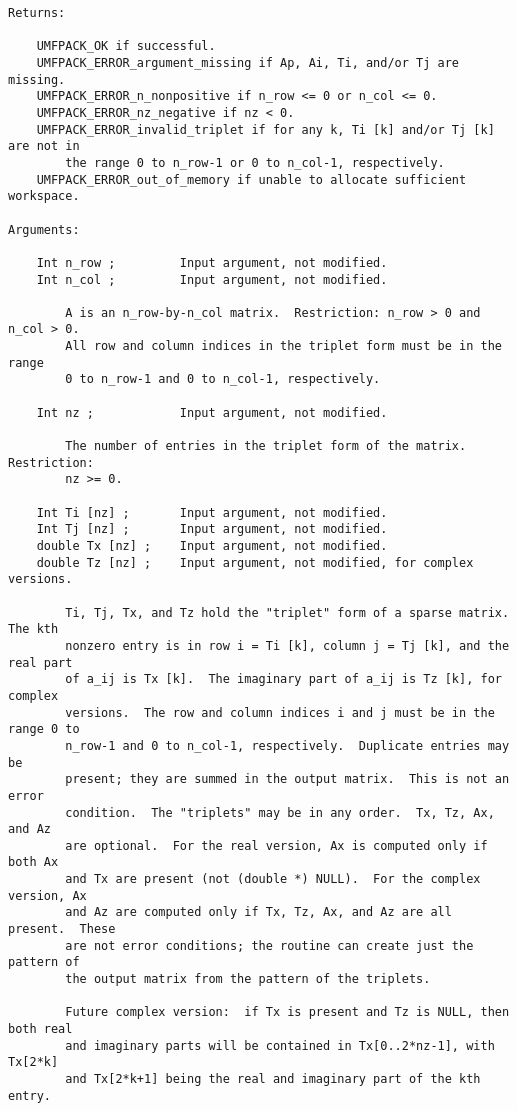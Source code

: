 {\begin{verbatim}
Returns:

    UMFPACK_OK if successful.
    UMFPACK_ERROR_argument_missing if Ap, Ai, Ti, and/or Tj are missing.
    UMFPACK_ERROR_n_nonpositive if n_row <= 0 or n_col <= 0.
    UMFPACK_ERROR_nz_negative if nz < 0.
    UMFPACK_ERROR_invalid_triplet if for any k, Ti [k] and/or Tj [k] are not in
        the range 0 to n_row-1 or 0 to n_col-1, respectively.
    UMFPACK_ERROR_out_of_memory if unable to allocate sufficient workspace.

Arguments:

    Int n_row ;         Input argument, not modified.
    Int n_col ;         Input argument, not modified.

        A is an n_row-by-n_col matrix.  Restriction: n_row > 0 and n_col > 0.
        All row and column indices in the triplet form must be in the range
        0 to n_row-1 and 0 to n_col-1, respectively.

    Int nz ;            Input argument, not modified.

        The number of entries in the triplet form of the matrix.  Restriction:
        nz >= 0.

    Int Ti [nz] ;       Input argument, not modified.
    Int Tj [nz] ;       Input argument, not modified.
    double Tx [nz] ;    Input argument, not modified.
    double Tz [nz] ;    Input argument, not modified, for complex versions.

        Ti, Tj, Tx, and Tz hold the "triplet" form of a sparse matrix.  The kth
        nonzero entry is in row i = Ti [k], column j = Tj [k], and the real part
        of a_ij is Tx [k].  The imaginary part of a_ij is Tz [k], for complex
        versions.  The row and column indices i and j must be in the range 0 to
        n_row-1 and 0 to n_col-1, respectively.  Duplicate entries may be
        present; they are summed in the output matrix.  This is not an error
        condition.  The "triplets" may be in any order.  Tx, Tz, Ax, and Az
        are optional.  For the real version, Ax is computed only if both Ax
        and Tx are present (not (double *) NULL).  For the complex version, Ax
        and Az are computed only if Tx, Tz, Ax, and Az are all present.  These
        are not error conditions; the routine can create just the pattern of
        the output matrix from the pattern of the triplets.

        Future complex version:  if Tx is present and Tz is NULL, then both real
        and imaginary parts will be contained in Tx[0..2*nz-1], with Tx[2*k]
        and Tx[2*k+1] being the real and imaginary part of the kth entry.


\end{verbatim}}
